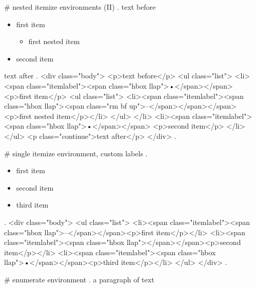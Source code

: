 #
nested itemize environments (II)
.
text before
\begin{itemize}
    \item first item
        \begin{itemize}
            \item first nested item
        \end{itemize}
    \item second item
\end{itemize}
text after
.
<div class="body">
<p>text before</p>
<ul class="list">
<li><span class="itemlabel"><span class="hbox llap">•</span></span>
<p>ﬁrst item</p>
<ul class="list">
<li><span class="itemlabel"><span class="hbox llap"><span class="rm bf up">–</span></span></span><p>ﬁrst nested item</p></li>
</ul>
</li>
<li><span class="itemlabel"><span class="hbox llap">•</span></span>
<p>second item</p>
</li>
</ul>
<p class="continue">text after</p>
</div>
.


#
single itemize environment, custom labels
.
\begin{itemize}
    \item[\textendash] first item
    \item[] second item
    \item third item
\end{itemize}
.
<div class="body">
<ul class="list">
<li><span class="itemlabel"><span class="hbox llap">–</span></span><p>ﬁrst item</p></li>
<li><span class="itemlabel"><span class="hbox llap"></span></span><p>second item</p></li>
<li><span class="itemlabel"><span class="hbox llap">•</span></span><p>third item</p></li>
</ul>
</div>
.


#
enumerate environment
.
a paragraph of text

